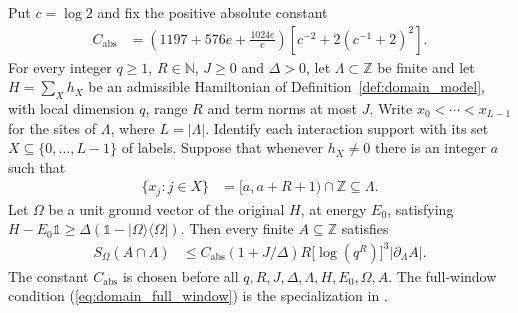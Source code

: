 \begin{corollary}
    \label{thm:domain_window_polynomial_range}
    \leanok
    Put $c=\log2$ and fix the positive absolute constant
    \begin{align}
        C_{\mathrm{abs}}
         & =\left(1197+576e+\frac{1024e}{c}\right)
        \left[c^{-2}+2(c^{-1}+2)^2\right].
        \label{eq:domain_window_constant}
    \end{align}
    For every integer $q\ge1$, $R\in\mathbb N$, $J\ge0$ and $\Delta>0$,
    let $\Lambda\subset\mathbb Z$ be finite and let $H=\sum_Xh_X$ be
    an admissible Hamiltonian of Definition~\ref{def:domain_model},
    with local dimension $q$, range $R$ and term norms at most $J$.
    Write $x_0<\cdots<x_{L-1}$ for the sites of $\Lambda$, where
    $L=|\Lambda|$. Identify each interaction support with its set
    $X\subseteq\{0,\ldots,L-1\}$ of labels. Suppose that whenever
    $h_X\ne0$ there is an integer $a$ such that
    \begin{align}
        \{x_j:j\in X\}
         & =[a,a+R+1)\cap\mathbb Z\subseteq\Lambda.
        \label{eq:domain_full_window}
    \end{align}
    Let $\Omega$ be a unit ground vector of the original $H$, at
    energy $E_0$, satisfying
    $H-E_0\mathbb 1\ge\Delta(\mathbb 1-|\Omega\rangle\langle\Omega|)$.
    Then every finite $A\subseteq\mathbb Z$ satisfies
    \begin{align}
        S_\Omega(A\cap\Lambda)
         & \le C_{\mathrm{abs}}(1+J/\Delta)R
        \bigl[\log(q^R)\bigr]^3|\partial_\Lambda A|.
        \label{eq:domain_window_area_law}
    \end{align}
    The constant $C_{\mathrm{abs}}$ is chosen before all
    $q,R,J,\Delta,\Lambda,H,E_0,\Omega,A$. The full-window condition
    (\ref{eq:domain_full_window}) is the specialization in
    \cite[Part~I, the remark on sharper constants]{TNLean2026OneDimensional}.
\end{corollary}
